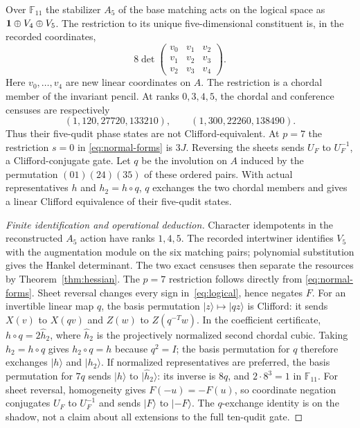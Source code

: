\begin{proposition}\label{prop:shadow}
Over $\mathbb F_{11}$ the stabilizer $A_5$ of the base matching acts on the
logical space as $\mathbf 1\oplus V_4\oplus V_5$. The restriction to its unique
five-dimensional constituent is, in the recorded coordinates,
\[
 8\det\begin{pmatrix}v_0&v_1&v_2\\v_1&v_2&v_3\\v_2&v_3&v_4\end{pmatrix}.
\]
Here $v_0,\ldots,v_4$ are new linear coordinates on $A$.
The restriction is a chordal member of the invariant pencil. At ranks $0,3,4,5$, the
chordal and conference censuses are respectively
\[
 (1,120,27720,133210),\qquad (1,300,22260,138490).
\]
Thus their five-qudit phase states are not Clifford-equivalent. At $p=7$ the restriction $s=0$ in
\eqref{eq:normal-forms} is $3J$.
Reversing the sheets sends $U_F$ to $U_F^{-1}$, a Clifford-conjugate gate.
Let $q$ be the involution on $A$ induced by the permutation $(01)(24)(35)$
of these ordered pairs.
With actual representatives $h$ and $h_2=h\circ q$,
$q$ exchanges the two chordal members and gives a linear Clifford equivalence
of their five-qudit states.
\end{proposition}
\begin{proof}[Finite identification and operational deduction]
Character idempotents in the reconstructed $A_5$ action have ranks $1,4,5$.
The recorded intertwiner identifies $V_5$ with the augmentation module on the
six matching pairs; polynomial substitution gives the Hankel determinant.
The two exact censuses then separate the resources by
Theorem~\ref{thm:hessian}. The $p=7$ restriction follows directly from
\eqref{eq:normal-forms}.
Sheet reversal changes every sign in~\eqref{eq:logical}, hence negates $F$.
For an invertible linear map $q$, the basis permutation $|z\rangle\mapsto|qz\rangle$
is Clifford: it sends $X(v)$ to $X(qv)$ and $Z(w)$ to $Z(q^{-T}w)$.
In the coefficient certificate, $h\circ q=2\widehat h_2$, where
$\widehat h_2$ is the projectively normalized second chordal cubic.
Taking $h_2=h\circ q$ gives $h_2\circ q=h$ because $q^2=I$;
the basis permutation for $q$ therefore exchanges $|h\rangle$ and
$|h_2\rangle$. If normalized representatives are preferred, the basis
permutation for $7q$ sends $|h\rangle$ to $|\widehat h_2\rangle$:
its inverse is $8q$, and $2\cdot8^3=1$ in $\mathbb F_{11}$.
For sheet reversal, homogeneity gives $F(-u)=-F(u)$, so coordinate
negation conjugates $U_F$ to $U_F^{-1}$ and sends $|F\rangle$ to
$|-F\rangle$. The $q$-exchange identity is on the shadow, not a claim about all extensions
to the full ten-qudit gate.
\end{proof}

